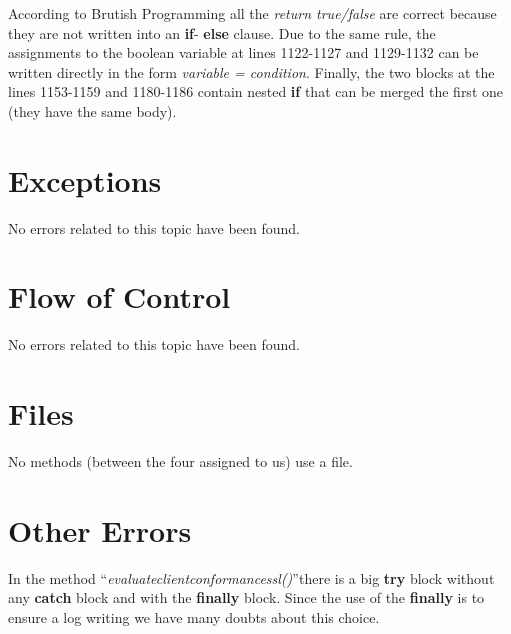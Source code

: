 \documentclass[\mainpath/main]{subfiles}
\begin{document}
According to Brutish Programming all the \textit{return true/false} are correct because they are not written into an \textbf{\color{javapurple} if}-\textbf{\color{javapurple} else} clause. Due to the same rule, the assignments to the boolean variable at lines 1122-1127 and 1129-1132 can be written directly in the form \textit{variable = condition}.
Finally, the two blocks at the lines 1153-1159 and 1180-1186 contain nested \textbf{\color{javapurple} if} that can be merged the first one (they have the same body).

\section{Exceptions}
\label{CodeInspectionChecklist:Exceptions}
No errors related to this topic have been found.

\section{Flow of Control}
\label{CodeInspectionChecklist:FlowofControl}
No errors related to this topic have been found.

\section{Files}
\label{CodeInspectionChecklist:Files}
No methods (between the four assigned to us) use a file.

\section{Other Errors}
\label{CodeInspectionChecklist:OtherErrors}
In the method \textquotedblleft \textit{evaluate\textunderscore client\textunderscore conformance\textunderscore ssl(\textellipsis)}\textquotedblright there is a big \textbf{\color{javapurple} try} block without any \textbf{\color{javapurple} catch} block and with the \textbf{\color{javapurple} finally} block. Since the use of the \textbf{\color{javapurple} finally} is to ensure a log writing we have many doubts about this choice.
\end{document}
